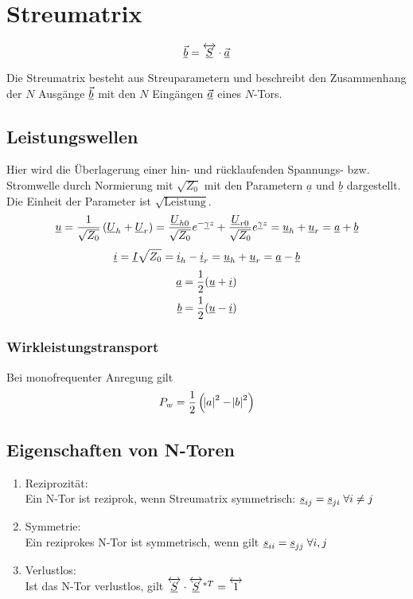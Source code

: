 \chapter{Streumatrix}

\begin{equation}
    \underline{\vec{b}} = \overleftrightarrow{\underline{S}} \cdot \underline{\vec{a}}
\end{equation}

Die Streumatrix besteht aus Streuparametern und beschreibt den Zusammenhang der $N$ Ausgänge $\underline{\vec{b}}$ mit
den $N$ Eingängen $\underline{\vec{a}}$ eines $N$-Tors.

\section{Leistungswellen}
Hier wird die Überlagerung einer hin- und rücklaufenden Spannungs- bzw. Stromwelle durch Normierung mit $\sqrt{Z_0}$ mit den Parametern $\underline{a}$ und $\underline{b}$ dargestellt. Die Einheit der Parameter ist $\sqrt{\text{Leistung}}$.
\begin{equation}
    \underline{u} = \frac{1}{\sqrt{Z_0}} \left( \underline{U}_h + \underline{U}_r \right) = \frac{\underline{U}_{h0}}{\sqrt{Z_0}} e^{-\underline{\gamma} z} + \frac{\underline{U}_{r0}}{\sqrt{Z_0}} e^{\underline{\gamma} z} = \underline{u}_h + \underline{u}_r = \underline{a} + \underline{b}
\end{equation}
\begin{equation}
    \underline{i} = \underline{I} \sqrt{Z_0} =  \underline{i}_h - \underline{i}_r = \underline{u}_h + \underline{u}_r = \underline{a} - \underline{b}
\end{equation}
\begin{align}
    \underline{a} &= \frac{1}{2} (\underline{u} + \underline{i})\\
    \underline{b} &= \frac{1}{2} (\underline{u} - \underline{i})
\end{align}

\subsection{Wirkleistungstransport}
Bei monofrequenter Anregung gilt
\begin{equation}
    P_w = \frac{1}{2} \left( \abs{a}^2 - \abs{b}^2 \right)
\end{equation}

\section{Eigenschaften von N-Toren}
\begin{enumerate}
    \item Reziprozität:\\
        Ein N-Tor ist reziprok, wenn Streumatrix symmetrisch: $\underline{s}_{ij} = \underline{s}_{ji} \;  \forall i\neq j$
    \item Symmetrie:\\
        Ein reziprokes N-Tor ist symmetrisch, wenn gilt $\underline{s}_{ii} = \underline{s}_{jj} \; \forall i,j$
    \item Verlustlos:\\
        Ist das N-Tor verlustlos, gilt $\overleftrightarrow{\underline{S}} \cdot \overleftrightarrow{\underline{S}} ^{*T} = \overleftrightarrow{1}$
\end{enumerate}


